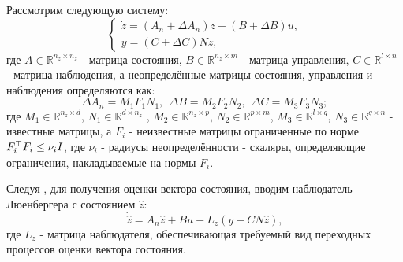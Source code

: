 Рассмотрим следующую систему: 
%
\begin{equation}
	\label{eq:part2_linear_dynamics}
	\begin{cases}
		\dot z=({A}_n+\Delta {A}_n)z + ({B}+\Delta {B})u,\\
		y = ({C}+ \Delta {C}){N}  z,
	\end{cases}
\end{equation}
%
где $A \in \mathbb{R}^{n_z \times n_z}$ - матрица состояния, $B \in \mathbb{R}^{n_z \times m}$ - матрица управления, $C \in \mathbb{R}^{l \times n}$ - матрица наблюдения, а неопределённые матрицы состояния, управления и наблюдения определяются как:
%
\begin{equation}
	\label{eq:part2_uncertainty}
	\Delta {A}_n={M}_1{F}_1{N}_1, \ \ \Delta {B}= {M}_2{F}_2{N}_2, \ \
	\Delta {C} = {M}_3{F}_3{N}_3; 
\end{equation}
%
где ${M}_1 \in \mathbb{R}^{n_z \times d}$, 
${N}_1 \in \mathbb{R}^{d \times n_z}$ , ${M}_2 \in \mathbb{R}^{n_z \times p}$,
${N}_2 \in \mathbb{R}^{p \times m}$, ${M}_3 \in \mathbb{R}^{l \times q}$,
${N}_3 \in \mathbb{R}^{q \times n}$ - известные матрицы, 
а ${F}_i$ - неизвестные матрицы ограниченные по норме ${F}_i^\top{F}_i\leq \nu_i {I}$, где $\nu_i$ - радиусы неопределённости - скаляры, определяющие ограничения, накладываемые на нормы ${F}_i$. 

Следуя \cite{SAVIN2021}, для получения оценки вектора состояния, вводим наблюдатель Люенбергера с состоянием $\hat{z}$:
%
\begin{equation}
	\label{eq:Luenberger}
	\dot{\hat{z}}={A}_n\hat{z}+{B}u+{L}_z(y- {C} {N}\hat{z}),
\end{equation}
%
где ${L}_z$ - матрица наблюдателя, обеспечивающая требуемый вид переходных процессов оценки вектора состояния. 
 
